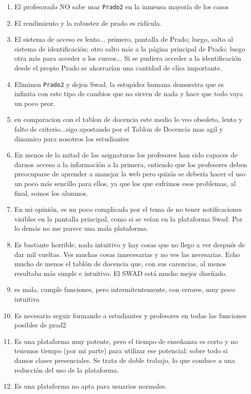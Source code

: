 \begin{enumerate}
\item El profesorado NO sabe usar \texttt{Prado2} en la inmensa mayoría de los casos
\item El rendimiento y la robustez de prado es ridícula.
\item El sistema de acceso es lento... primero, pantalla de Prado; luego, salto al sistema de identificación; otro salto más a la página principal de Prado; luego otra más para acceder a los cursos... Si se pudiera acceder a la identificación desde el propio Prado se ahorrarían una cantidad de clics importante.
\item Eliminen \texttt{Prado2} y dejen Swad, la estupidez humana demuestra que es infinita con este tipo de cambios que no sirven de nada y hace que todo vaya un poco peor.
\item en comparacion con el tablon de docencia este medio lo veo obsoleto, lento y falto de criterio...sigo apostando por el Tablon de Docencia mas agil y dinamico para nosotros los estudiantes
\item En menos de la mitad de las asignaturas los profesores han sido capaces de darnos acceso a la información a la primera, entiendo que los profesores deben preocuparse de aprender a manejar la web pero quizás se debería hacer el uso un poco más sencillo para ellos, ya que los que sufrimos esos problemas, al final, somos los alumnos.
\item En mi opinión, es un poco complicada por el tema de no tener notificaciones visibles en la pantalla principal, como si se veían en la plataforma Swad. Por lo demás no me parece una mala plataforma.
\item Es bastante horrible, nada intuitivo y hay cosas que no llego a ver después de dar mil vueltas. Ves muchas cosas innecesarias y no ves las necesarias. Echo mucho de menos el tablón de docencia que, con sus carencias, al menos resultaba más simple e intuitivo. El SWAD está mucho mejor diseñado.
\item es mala, cumple funciones, pero intermitentemente, con errores, muy poco intuitiva
\item Es necesario seguir formando a estudiantes y profesores en todas las funciones posibles de prad2
\item Es una plataforma muy potente, pero el tiempo de enseñanza es corto y no tenemos tiempo (por mi parte) para utilizar ese potencial; sobre todo si damos clases presenciales. Se trata de doble trabajo, lo que conduce a una reducción del uso de la plataforma.
\item Es una plataforma no apta para usuarios normales.

\end{enumerate}
